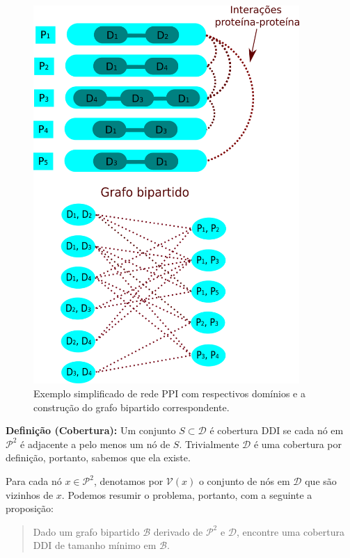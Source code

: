 \documentclass[11pt]{article}
\begin{document}
\begin{figure}
    \centering
    \includegraphics[width=0.9\textwidth]{images/ddi-ppi-example.png}
    \caption{Exemplo simplificado de rede PPI com respectivos domínios e a
    construção do grafo bipartido correspondente.}
    \label{fig3:example}
\end{figure}

{\bf Definição (Cobertura):} Um conjunto \(S \subset \mathcal{D}\) é cobertura
DDI se cada nó em \(\mathcal{P}^2\) é adjacente a pelo menos um nó de
\(S\). Trivialmente \(\mathcal{D}\) é uma cobertura por definição,
portanto, sabemos que ela existe.

Para cada nó \(x \in \mathcal{P}^2\), denotamos por \(\mathcal{V}(x)\) o
conjunto de nós em \(\mathcal{D}\) que são vizinhos de \(x\). Podemos
resumir o problema, portanto, com a seguinte a proposição:

\begin{quote}
Dado um grafo bipartido \(\mathcal{B}\) derivado de \(\mathcal{P}^2\) e
\(\mathcal{D}\), encontre uma cobertura DDI de tamanho mínimo em
\(\mathcal{B}\).
\end{quote}
\end{document}

